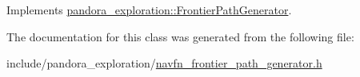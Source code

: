 \-Implements \hyperlink{classpandora__exploration_1_1_frontier_path_generator_aa924645e9008eaf4776bbf044fd89c3e}{pandora\-\_\-exploration\-::\-Frontier\-Path\-Generator}.



\-The documentation for this class was generated from the following file\-:\begin{DoxyCompactItemize}
\item 
include/pandora\-\_\-exploration/\hyperlink{navfn__frontier__path__generator_8h}{navfn\-\_\-frontier\-\_\-path\-\_\-generator.\-h}\end{DoxyCompactItemize}
